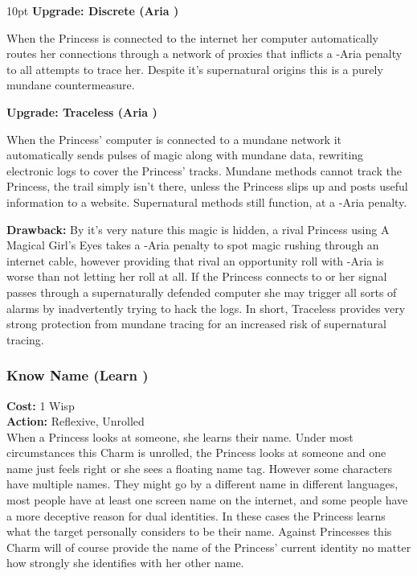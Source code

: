 \begin{myindentpar}{10pt}
\textbf{Upgrade: Discrete (Aria \textbullet\textbullet)}

When the Princess is connected to the internet her computer automatically routes her connections through a network of proxies that inflicts a -Aria penalty to all attempts to trace her. Despite it's supernatural origins this is a purely mundane countermeasure.

\textbf{Upgrade: Traceless (Aria \textbullet\textbullet)}

When the Princess' computer is connected to a mundane network it automatically sends pulses of magic along with mundane data, rewriting electronic logs to cover the Princess' tracks. Mundane methods cannot track the Princess, the trail simply isn't there, unless the Princess slips up and posts useful information to a website. Supernatural methods still function, at a -Aria penalty. 

\textbf{Drawback:} By it's very nature this magic is hidden, a rival Princess using A Magical Girl's Eyes takes a -Aria penalty to spot magic rushing through an internet cable, however providing that rival an opportunity roll with -Aria is worse than not letting her roll at all. If the Princess connects to or her signal passes through a supernaturally defended computer she may trigger all sorts of alarms by inadvertently trying to hack the logs. In short, Traceless provides very strong protection from mundane tracing for an increased risk of supernatural tracing. \end{myindentpar}

\subsubsection*{Know Name (Learn \textbullet)}

\noindent \textbf{Cost:} 1 Wisp\\

\noindent \textbf{Action:} Reflexive, Unrolled\\

\noindent When a Princess looks at someone, she learns their name. Under most circumstances this Charm is unrolled, the Princess looks at someone and one name just feels right or she sees a floating name tag. However some characters have multiple names. They might go by a different name in different languages, most people have at least one screen name on the internet, and some people have a more deceptive reason for dual identities. In these cases the Princess learns what the target personally considers to be their name. Against Princesses this Charm will of course provide the name of the Princess' current identity no matter how strongly she identifies with her other name. 

